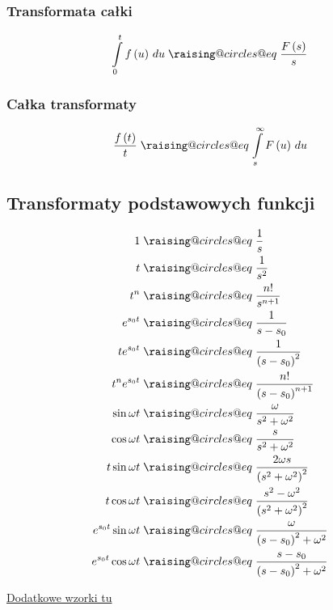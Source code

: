 \documentclass[a4paper,12pt]{article}
\makeatletter
\newcommand{\odpowiada}{\mathrel{\mathpalette\raising@circles@eq\relax}}
\newcommand{\raising@circles@eq}[2]{%
  \vphantom{#1+}%
  \vbox{
    \settowidth\unitlength{$#1\mspace{2mu}$}%
    \offinterlineskip\m@th
    \ialign{##\cr
      \hfil\small@circle{#1}$#1\mspace{1.5mu}$\cr\noalign{\vskip0.5\unitlength}
      $#1=$\cr\noalign{\post@vskip{+}{#1}}
      $#1\mspace{1.5mu}$\small@circle{#1}\hfill\cr\noalign{\post@vskip{-}{#1}}
    }%
  }%
}
\newcommand{\small@circle}[1]{%
  \smash{%
    \begin{picture}(1,1)
    \small@linethickness{#1}
    \put(0.5,0.5){\circle{1}}
    \end{picture}%
  }%
}
\newcommand{\small@linethickness}[1]{%
  \linethickness{%
      \ifx#1\displaystyle 0.8\fontdimen8\textfont3\else
      \ifx#1\textstyle 0.8\fontdimen8\textfont3\else
      \ifx#1\scriptstyle0.8\fontdimen8\scriptfont3\else
      1\fontdimen8\scriptscriptfont3\fi\fi\fi
  }%
}
\newcommand{\post@vskip}[2]{%
  \expandafter\vskip\expanded{%
    #1\ifx#2\scriptscriptstyle0.9\else\ifx#2\scriptstyle0.6\else0.3\fi\fi\unitlength
  }%
}
\makeatother
\begin{document}
\begin{multicols}{2}
    \subsubsection*{Transformata całki}

    \[
        \int \limits^t_0 f\left( u \right) \, du \odpowiada \frac{F \left( s \right)}{s}
    \]

    \subsubsection*{Całka transformaty} 

    \[
        \frac{f \left( t \right)}{t} \odpowiada \int \limits^\infty_s F\left(u\right) \, du
    \]

    \subsection*{Transformaty podstawowych funkcji}

    \begingroup
    \allowdisplaybreaks
    \begin{align*}
        1 &\odpowiada \frac{1}{s} \\
        t &\odpowiada \frac{1}{s^2} \\
        t^n &\odpowiada \frac{n!}{s^{n + 1}} \\
        e^{s_0 t} &\odpowiada \frac{1}{s - s_0} \\
        t e^{s_0 t} &\odpowiada \frac{1}{\left( s - s_0\right)^2} \\
        t^n e^{s_0 t} &\odpowiada \frac{n!}{\left( s - s_0\right)^{n + 1}} \\
        \sin \omega t &\odpowiada \frac{\omega}{s^2 + \omega^2} \\
        \cos \omega t &\odpowiada \frac{s}{s^2 + \omega^2} \\
        t \sin \omega t &\odpowiada \frac{2 \omega s}{\left(s^2 + \omega^2\right)^2} \\
        t \cos \omega t &\odpowiada \frac{s^2 - \omega^2}{\left(s^2 + \omega^2\right)^2} \\
        e^{s_0 t} \sin \omega t &\odpowiada \frac{\omega}{\left( s - s_0 \right)^2 + \omega^2} \\
        e^{s_0 t} \cos \omega t &\odpowiada \frac{s - s_0}{\left( s - s_0 \right)^2 + \omega^2} \\
    \end{align*}
    \endgroup

    \href{https://www.math.purdue.edu/~caiz/MA527-cai/lectures/Table%20of%20Laplace%20Transforms.pdf}{Dodatkowe wzorki tu}


\end{multicols}
\end{document}
